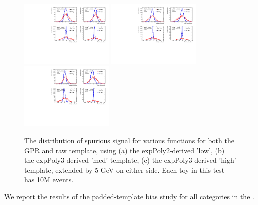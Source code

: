 \begin{figure} 
\begin{center}
  \includegraphics[width=0.4\textwidth]{figures/background/gpr/validation/padded/ToyTest_FitSigVals_lowpT_10M_noSig}   
  \includegraphics[width=0.4\textwidth]{figures/background/gpr/validation/padded/ToyTest_FitSigVals_medpT_10M_noSig}   
  \includegraphics[width=0.4\textwidth]{figures/background/gpr/validation/padded/ToyTest_FitSigVals_highpT_10M_noSig}   
\caption{The distribution of spurious signal for various functions for both the GPR and raw template, using (a) the expPoly2-derived 'low', (b) the expPoly3-derived 'med' template, (c) the expPoly3-derived 'high' template, extended by 5 GeV on either side. Each toy in this test has 10M events.}
\label{fig:padded_lowpt_10M_noSig}
\end{center}
\end{figure}


We report the results of the padded-template bias study for all categories in the \Tab{\ref{tab:NoSigSSpadded}}.

